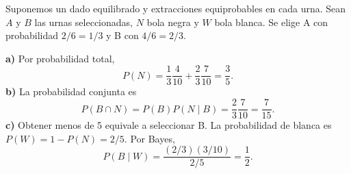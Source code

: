 Suponemos un dado equilibrado y extracciones equiprobables en cada urna. Sean $A$ y $B$ las urnas seleccionadas, $N$ bola negra y $W$ bola blanca. Se elige A con probabilidad $2/6=1/3$ y B con $4/6=2/3$.

\textbf{a)} Por probabilidad total,
\[
 P(N)=\frac13\frac4{10}+\frac23\frac7{10}
 =\boxed{\frac35}.
\]
\textbf{b)} La probabilidad conjunta es
\[
 P(B\cap N)=P(B)P(N\mid B)=\frac23\frac7{10}
 =\boxed{\frac7{15}}.
\]
\textbf{c)} Obtener menos de 5 equivale a seleccionar B. La probabilidad de blanca es $P(W)=1-P(N)=2/5$. Por Bayes,
\[
 P(B\mid W)=\frac{(2/3)(3/10)}{2/5}=\boxed{\frac12}.
\]
